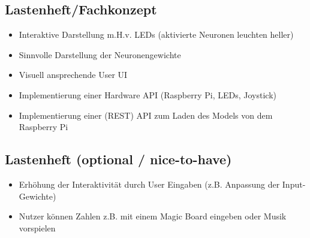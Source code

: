 \subsection{Lastenheft/Fachkonzept}
\label{sec:Lastenheft}
\begin{itemize}
	\item Interaktive Darstellung m.H.v. LEDs (aktivierte Neuronen leuchten heller)
	\item Sinnvolle Darstellung der Neuronengewichte
	\item Visuell ansprechende User UI
	\item Implementierung einer Hardware API (Raspberry Pi, LEDs, Joystick)
	\item Implementierung einer (REST) API zum Laden des Models von dem Raspberry Pi
\end{itemize}

\subsection{Lastenheft (optional / nice-to-have)}
\label{sec:Lastenheft2}
\begin{itemize}
	\item Erh\"ohung der Interaktivit\"at durch User Eingaben (z.B. Anpassung der Input-Gewichte)
	\item Nutzer k\"onnen Zahlen z.B. mit einem Magic Board eingeben oder Musik vorspielen
\end{itemize}
%
